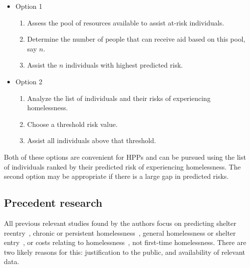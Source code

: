 \documentclass[10pt,letterpaper]{article}
\begin{document}
\begin{itemize}
    \item Option 1
    \begin{enumerate}
        \item Assess the pool of resources available to assist at-risk individuals.
        \item Determine the number of people that can receive aid based on this pool, say $n$.
        \item Assist the $n$ individuals with highest predicted risk.
    \end{enumerate}
    \item Option 2
    \begin{enumerate}
        \item Analyze the list of individuals and their risks of experiencing homelessness.
        \item Choose a threshold risk value.
        \item Assist all individuals above that threshold.
    \end{enumerate}
\end{itemize}

Both of these options are convenient for HPPs and can be pursued using the list of individuals ranked by their predicted risk of experiencing homelessness. The second option may be appropriate if there is a large gap in predicted risks.

\subsection*{Precedent research}
All previous relevant studies found by the authors focus on predicting shelter reentry~\cite{hong2018applications}, chronic or persistent homelessness~\cite{vanberlo2021interpretable, toros2019early}, general homelessness or shelter entry~\cite{byrne2020classification, shinn2013efficient}, or costs relating to homelessness~\cite{flaming2011crisis}, not first-time homelessness. There are two likely reasons for this: justification to the public, and availability of relevant data.
\end{document}
